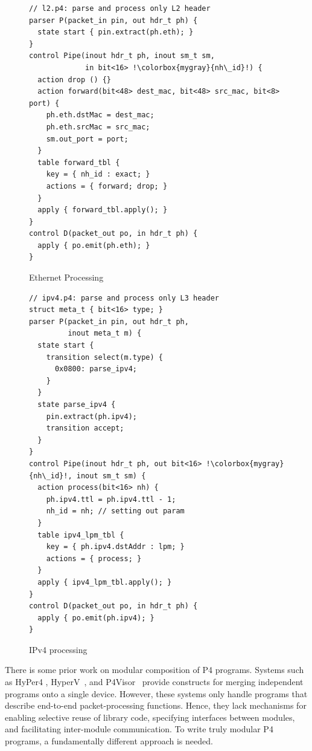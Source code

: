 \documentclass[letterpaper,twocolumn,10pt]{article}
\begin{document}
\begin{figure}[ht]
\begin{lstlisting}[frame=none, escapechar=!]
// l2.p4: parse and process only L2 header
parser P(packet_in pin, out hdr_t ph) {
  state start { pin.extract(ph.eth); }
}
control Pipe(inout hdr_t ph, inout sm_t sm,
             in bit<16> !\colorbox{mygray}{nh\_id}!) {
  action drop () {}
  action forward(bit<48> dest_mac, bit<48> src_mac, bit<8> port) {
    ph.eth.dstMac = dest_mac;
    ph.eth.srcMac = src_mac;
    sm.out_port = port;
  }
  table forward_tbl {
    key = { nh_id : exact; }
    actions = { forward; drop; }
  }
  apply { forward_tbl.apply(); }
}
control D(packet_out po, in hdr_t ph) {
  apply { po.emit(ph.eth); }
}
\end{lstlisting}
\caption{Ethernet Processing}
\label{fig:l2.p4}
\end{figure}

\begin{figure}[ht]
\begin{lstlisting}[frame=none, escapechar=!]
// ipv4.p4: parse and process only L3 header
struct meta_t { bit<16> type; }
parser P(packet_in pin, out hdr_t ph,
         inout meta_t m) {
  state start {
    transition select(m.type) {
      0x0800: parse_ipv4;
    }
  }
  state parse_ipv4 {
    pin.extract(ph.ipv4);
    transition accept;
  }
}
control Pipe(inout hdr_t ph, out bit<16> !\colorbox{mygray}{nh\_id}!, inout sm_t sm) {
  action process(bit<16> nh) {
    ph.ipv4.ttl = ph.ipv4.ttl - 1;
    nh_id = nh; // setting out param
  }
  table ipv4_lpm_tbl {
    key = { ph.ipv4.dstAddr : lpm; }
    actions = { process; }
  }
  apply { ipv4_lpm_tbl.apply(); }
}
control D(packet_out po, in hdr_t ph) {
  apply { po.emit(ph.ipv4); }
}
\end{lstlisting}
\caption{IPv4 processing}
\label{fig:ipv4.p4}
\end{figure}


There is some prior work on modular composition of P4 programs.
Systems such as HyPer4 \cite{Hancock:2016:HUP:2999572.2999607},
HyperV~\cite{8038396}, and
P4Visor~\cite{Zheng:2018:PLV:3281411.3281436} provide constructs for
merging independent programs onto a single device. However, these
systems only handle programs that describe end-to-end
packet-processing functions. Hence, they lack mechanisms for enabling
selective reuse of library code, specifying interfaces between
modules, and facilitating inter-module communication. To write truly
modular P4 programs, a fundamentally different approach is needed.
\end{document}
